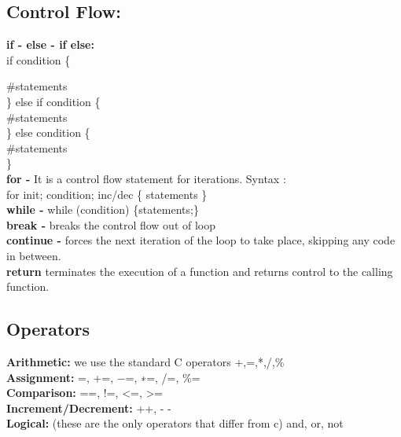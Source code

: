 \documentclass[11pt]{article}
\begin{document}
\subsection{Control Flow:}
\begin{adjustwidth}{1cm}{}
\textbf {if - else - if else: } \\
if condition \{

\indent \indent \#statements\\
\} else if condition \{\\
\indent \indent \#statements\\
\} else condition \{ \\
\indent \indent \#statements\\
\}\\
 \textbf{for -} It is a control flow statement for iterations. Syntax :\\ \indent for init; condition; inc/dec \{ statements \} \\
\textbf{while -} while (condition) \{statements;\}\\
\textbf{break -} breaks the control flow out of loop \\
\textbf{continue -} forces the next iteration of the loop to take place, skipping any code in between. \\
\textbf{return} terminates the execution of a function and returns control to the calling function.
\end{adjustwidth}

\subsection{Operators}

\begin{adjustwidth}{1cm}{}
\textbf{Arithmetic:} we use the standard C operators +,=,*,/,\%\\
\textbf{Assignment:} =, +=, −=, ∗=, /=, \%=\\
\textbf{Comparison:} ==, !=, <=, >= \\
\textbf{Increment/Decrement:} ++, - - \\
\textbf{Logical:} (these are the only operators that differ from c) and, or, not
\end{adjustwidth}
\end{document}
